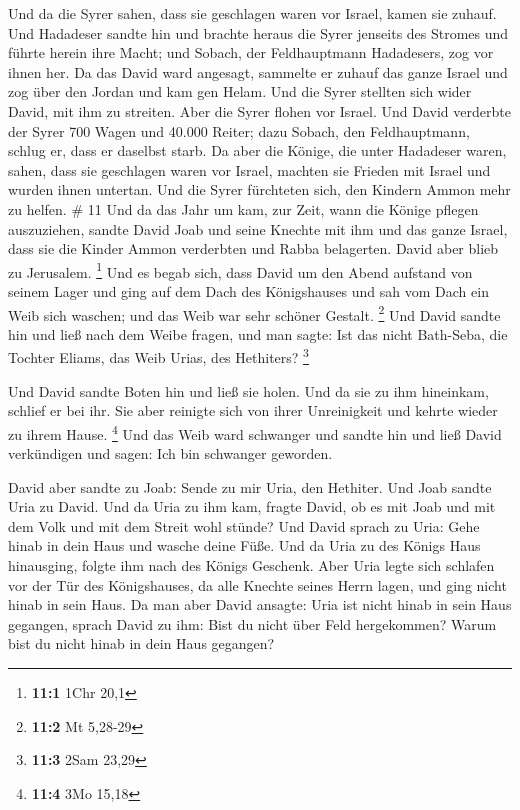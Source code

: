  Und da die Syrer sahen, dass sie geschlagen waren vor
Israel, kamen sie zuhauf.  Und Hadadeser sandte hin und
brachte heraus die Syrer jenseits des Stromes und führte herein ihre
Macht; und Sobach, der Feldhauptmann Hadadesers, zog vor ihnen her.
 Da das David ward angesagt, sammelte er zuhauf das ganze
Israel und zog über den Jordan und kam gen Helam. Und die Syrer stellten
sich wider David, mit ihm zu streiten.  Aber die Syrer
flohen vor Israel. Und David verderbte der Syrer 700 Wagen und 40.000
Reiter; dazu Sobach, den Feldhauptmann, schlug er, dass er daselbst
starb.  Da aber die Könige, die unter Hadadeser waren,
sahen, dass sie geschlagen waren vor Israel, machten sie Frieden mit
Israel und wurden ihnen untertan. Und die Syrer fürchteten sich, den
Kindern Ammon mehr zu helfen. \# 11  Und da das Jahr um
kam, zur Zeit, wann die Könige pflegen auszuziehen, sandte David Joab
und seine Knechte mit ihm und das ganze Israel, dass sie die Kinder
Ammon verderbten und Rabba belagerten. David aber blieb zu Jerusalem.
\footnote{\textbf{11:1} 1Chr 20,1}  Und es begab sich,
dass David um den Abend aufstand von seinem Lager und ging auf dem Dach
des Königshauses und sah vom Dach ein Weib sich waschen; und das Weib
war sehr schöner Gestalt. \footnote{\textbf{11:2} Mt 5,28-29}
 Und David sandte hin und ließ nach dem Weibe fragen, und
man sagte: Ist das nicht Bath-Seba, die Tochter Eliams, das Weib Urias,
des Hethiters? \footnote{\textbf{11:3} 2Sam 23,29}

 Und David sandte Boten hin und ließ sie holen. Und da sie
zu ihm hineinkam, schlief er bei ihr. Sie aber reinigte sich von ihrer
Unreinigkeit und kehrte wieder zu ihrem Hause. \footnote{\textbf{11:4}
  3Mo 15,18}  Und das Weib ward schwanger und sandte hin
und ließ David verkündigen und sagen: Ich bin schwanger geworden.

 David aber sandte zu Joab: Sende zu mir Uria, den
Hethiter. Und Joab sandte Uria zu David.  Und da Uria zu
ihm kam, fragte David, ob es mit Joab und mit dem Volk und mit dem
Streit wohl stünde?  Und David sprach zu Uria: Gehe hinab
in dein Haus und wasche deine Füße. Und da Uria zu des Königs Haus
hinausging, folgte ihm nach des Königs Geschenk.  Aber
Uria legte sich schlafen vor der Tür des Königshauses, da alle Knechte
seines Herrn lagen, und ging nicht hinab in sein Haus. 
Da man aber David ansagte: Uria ist nicht hinab in sein Haus gegangen,
sprach David zu ihm: Bist du nicht über Feld hergekommen? Warum bist du
nicht hinab in dein Haus gegangen?

